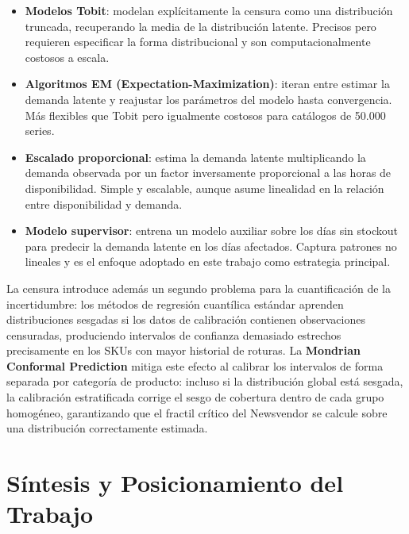 \begin{itemize}
    \item \textbf{Modelos Tobit}: modelan explícitamente la censura como una distribución truncada, recuperando la media de la distribución latente. Precisos pero requieren especificar la forma distribucional y son computacionalmente costosos a escala.
    \item \textbf{Algoritmos EM (Expectation-Maximization)}: iteran entre estimar la demanda latente y reajustar los parámetros del modelo hasta convergencia. Más flexibles que Tobit pero igualmente costosos para catálogos de 50.000 series.
    \item \textbf{Escalado proporcional}: estima la demanda latente multiplicando la demanda observada por un factor inversamente proporcional a las horas de disponibilidad. Simple y escalable, aunque asume linealidad en la relación entre disponibilidad y demanda.
    \item \textbf{Modelo supervisor}: entrena un modelo auxiliar sobre los días sin stockout para predecir la demanda latente en los días afectados. Captura patrones no lineales y es el enfoque adoptado en este trabajo como estrategia principal.
\end{itemize}

La censura introduce además un segundo problema para la cuantificación de la incertidumbre: los métodos de regresión cuantílica estándar aprenden distribuciones sesgadas si los datos de calibración contienen observaciones censuradas, produciendo intervalos de confianza demasiado estrechos precisamente en los SKUs con mayor historial de roturas. La \textbf{Mondrian Conformal Prediction} mitiga este efecto al calibrar los intervalos de forma separada por categoría de producto: incluso si la distribución global está sesgada, la calibración estratificada corrige el sesgo de cobertura dentro de cada grupo homogéneo, garantizando que el fractil crítico del Newsvendor se calcule sobre una distribución correctamente estimada.

\section{Síntesis y Posicionamiento del Trabajo}
\label{sec:posicionamiento}

